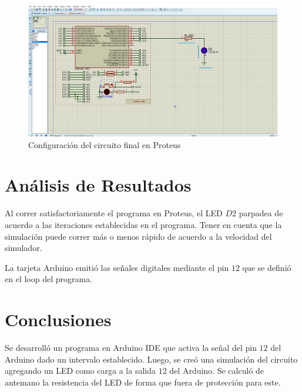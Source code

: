 \documentclass{article}
\begin{document}
\begin{figure}[H]
    \centering
    \includegraphics[width=0.5\paperwidth]{images/sim-2.png}
    \caption{Configuración del circuito final en Proteus}
\end{figure}

\section{Análisis de Resultados}

Al correr satisfactoriamente el programa en Proteus, el LED $D2$ parpadea de acuerdo a las iteraciones establecidas en el programa. Tener en cuenta que la simulación puede correr más o menos rápido de acuerdo a la velocidad del simulador.

\bigbreak

La tarjeta Arduino emitió las señales digitales mediante el pin $12$ que se definió en el loop del programa.

\section{Conclusiones}

Se desarrolló un programa en Arduino IDE que activa la señal del pin $12$ del Arduino dado un intervalo establecido. Luego, se creó una simulación del circuito agregando un LED como carga a la salida $12$ del Arduino. Se calculó de antemano la resistencia del LED de forma que fuera de protección para este.

\printbibliography
\end{document}
